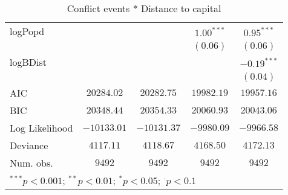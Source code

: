 \begin{sidewaystable}
\begin{center}
{\begin{tabular}{l c c c c}
logPopd              &               &               & $1.00^{***}$  & $0.95^{***}$  \\
                     &               &               & $(0.06)$      & $(0.06)$      \\
logBDist             &               &               &               & $-0.19^{***}$ \\
                     &               &               &               & $(0.04)$      \\
\hline
AIC                  & $20284.02$    & $20282.75$    & $19982.19$    & $19957.16$    \\
BIC                  & $20348.44$    & $20354.33$    & $20060.93$    & $20043.06$    \\
Log Likelihood       & $-10133.01$   & $-10131.37$   & $-9980.09$    & $-9966.58$    \\
Deviance             & $4117.11$     & $4118.67$     & $4168.50$     & $4172.13$     \\
Num. obs.            & $9492$        & $9492$        & $9492$        & $9492$        \\
\hline
\multicolumn{5}{l}{\scriptsize{$^{***}p<0.001$; $^{**}p<0.01$; $^{*}p<0.05$; $^{\cdot}p<0.1$}}
\end{tabular}
}
\caption{Conflict events *
		  Distance to capital}
\label{interaction_state_based}
\end{center}
\end{sidewaystable}
